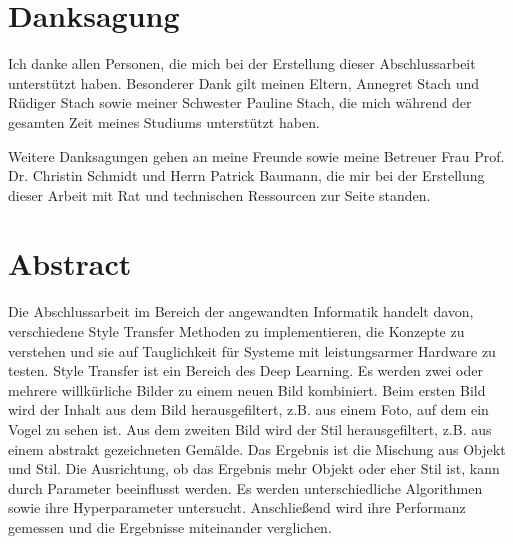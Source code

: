\chapter*{Danksagung}

Ich danke allen Personen, die mich bei der Erstellung dieser Abschlussarbeit unterstützt haben. Besonderer Dank gilt meinen Eltern, Annegret Stach und Rüdiger Stach sowie meiner Schwester Pauline Stach, die mich während der gesamten Zeit meines Studiums unterstützt haben.

Weitere Danksagungen gehen an meine Freunde sowie meine Betreuer Frau Prof. Dr. Christin Schmidt und Herrn Patrick Baumann, die mir bei der Erstellung dieser Arbeit mit Rat und technischen Ressourcen zur Seite standen.

\pagebreak

\chapter*{Abstract}

Die Abschlussarbeit im Bereich der angewandten Informatik handelt davon, verschiedene Style Transfer Methoden zu implementieren, die Konzepte zu verstehen und sie auf Tauglichkeit für Systeme mit leistungsarmer Hardware zu testen. Style Transfer ist ein Bereich des Deep Learning. Es werden zwei oder mehrere willkürliche Bilder zu einem neuen Bild kombiniert. Beim ersten Bild wird der Inhalt aus dem Bild herausgefiltert, z.B. aus einem Foto, auf dem ein Vogel zu sehen ist. Aus dem zweiten Bild wird der Stil herausgefiltert, z.B. aus einem abstrakt gezeichneten Gemälde. Das Ergebnis ist die Mischung aus Objekt und Stil. Die Ausrichtung, ob das Ergebnis mehr Objekt oder eher Stil ist, kann durch Parameter beeinflusst werden. Es werden unterschiedliche Algorithmen sowie ihre Hyperparameter untersucht. Anschließend wird ihre Performanz gemessen und die Ergebnisse miteinander verglichen.